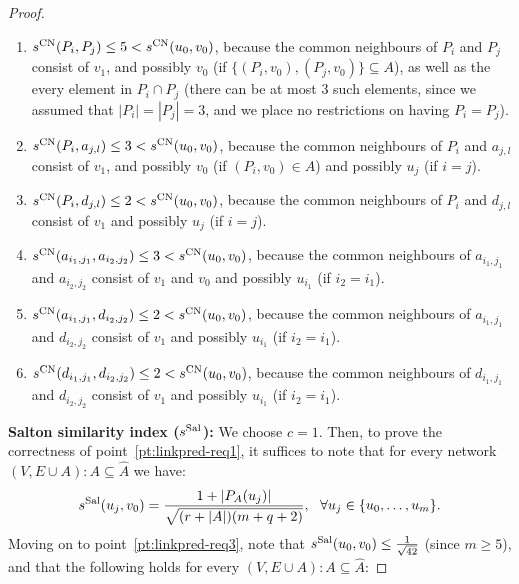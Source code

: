 \documentclass[twocolumn]{article}
\newcommand{\FA}{\widehat{A}}
\newcommand{\PA}{P_{A}}
\newcommand{\sCN}{s^{\text{\normalfont CN}}}
\newcommand{\sSal}{s^{\text{\normalfont Sal}}}
\begin{document}
\begin{proof}
\begin{enumerate}[label=(\roman*)]
\item $\sCN(P_i,P_j) \leq 5 < \sCN(u_0,v_0)$, because the common neighbours of $P_i$ and $P_j$ consist of $v_1$, and possibly $v_0$ (if $\{(P_i,v_0),(P_j,v_0)\}\subseteq A$), as well as the every element in $P_i\cap P_j$ (there can be at most 3 such elements, since we assumed that $|P_i|=|P_j|=3$, and we place no restrictions on having $P_i=P_j$).

\item $\sCN(P_i,a_{j,l}) \leq 3 < \sCN(u_0,v_0)$, because the common neighbours of $P_i$ and $a_{j,l}$ consist of $v_1$, and possibly $v_0$ (if $(P_i,v_0)\in A$) and possibly $u_j$ (if $i=j$).

\item $\sCN(P_i,d_{j,l}) \leq 2 < \sCN(u_0,v_0)$, because the common neighbours of $P_i$ and $d_{j,l}$ consist of $v_1$ and possibly $u_j$ (if $i=j$).

\item $\sCN(a_{i_1,j_1},a_{i_2,j_2}) \leq 3 < \sCN(u_0,v_0)$, because the common neighbours of $a_{i_1,j_1}$ and $a_{i_2,j_2}$ consist of $v_1$ and $v_0$ and possibly $u_{i_1}$ (if $i_2=i_1$).

\item $\sCN(a_{i_1,j_1},d_{i_2,j_2}) \leq 2 < \sCN(u_0,v_0)$, because the common neighbours of $a_{i_1,j_1}$ and $d_{i_2,j_2}$ consist of $v_1$ and possibly $u_{i_1}$ (if $i_2=i_1$).

\item $\sCN(d_{i_1,j_1},d_{i_2,j_2}) \leq 2 < \sCN(u_0,v_0)$, because the common neighbours of $d_{i_1,j_1}$ and $d_{i_2,j_2}$ consist of $v_1$ and possibly $u_{i_1}$ (if $i_2=i_1$).
\end{enumerate}

\noindent \textbf{Salton similarity index ($\sSal$):} We choose $c=1$. Then, to prove the correctness of point~\ref{pt:linkpred-req1}, it suffices to note that for every network $(V,E\cup A):A \subseteq \FA$ we have:
$$
\sSal(u_j,v_0)=\frac{1+|\PA(u_j)|}{\sqrt{(r+|A|)(m+q+2)}},\ \ \forall u_j\in\{u_0,\ldots, u_m\}.
$$
Moving on to point~\ref{pt:linkpred-req3}, note that $\sSal(u_0,v_0) \leq \frac{1}{\sqrt{42}}$ (since $m \geq 5$), and that the following holds for every $(V,E\cup A):A \subseteq \FA$:


\end{proof}
\end{document}
